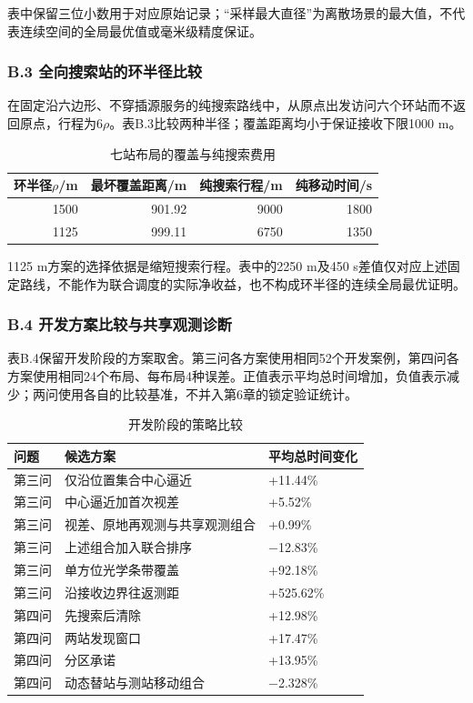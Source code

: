 \documentclass[UTF8,fontset=none,zihao=-4,a4paper]{ctexart}
\begin{document}
表中保留三位小数用于对应原始记录；``采样最大直径''为离散场景的最大值，不代表连续空间的全局最优值或毫米级精度保证。

\subsubsection{B.3 全向搜索站的环半径比较}\label{sec-B-3}

在固定沿六边形、不穿插源服务的纯搜索路线中，从原点出发访问六个环站而不返回原点，行程为\(6\rho\)。表B.3比较两种半径；覆盖距离均小于保证接收下限1000 m。

\begin{table}[H]
\centering\small
\caption{七站布局的覆盖与纯搜索费用}\label{tab-B-3}
\begin{tabular}{@{}rrrr@{}}
\toprule
环半径\(\rho\)/m & 最坏覆盖距离/m & 纯搜索行程/m & 纯移动时间/s\tabularnewline
\midrule

1500 & 901.92 & 9000 & 1800\tabularnewline
1125 & 999.11 & 6750 & 1350\tabularnewline
\bottomrule
\end{tabular}
\end{table}

1125 m方案的选择依据是缩短搜索行程。表中的2250 m及450 s差值仅对应上述固定路线，不能作为联合调度的实际净收益，也不构成环半径的连续全局最优证明。

\subsubsection{B.4 开发方案比较与共享观测诊断}\label{sec-B-4}

表B.4保留开发阶段的方案取舍。第三问各方案使用相同52个开发案例，第四问各方案使用相同24个布局、每布局4种误差。正值表示平均总时间增加，负值表示减少；两问使用各自的比较基准，不并入第6章的锁定验证统计。

\begin{table}[H]
\centering\small
\caption{开发阶段的策略比较}\label{tab-B-4}
\begin{tabular}{@{}>{\raggedright\arraybackslash}p{}
>{\raggedright\arraybackslash}p{}
>{\raggedright\arraybackslash}p{}@{}}
\toprule
问题 & 候选方案 & 平均总时间变化\tabularnewline
\midrule

第三问 & 仅沿位置集合中心逼近 & +11.44\%\tabularnewline
第三问 & 中心逼近加首次视差 & +5.52\%\tabularnewline
第三问 & 视差、原地再观测与共享观测组合 & +0.99\%\tabularnewline
第三问 & 上述组合加入联合排序 & −12.83\%\tabularnewline
第三问 & 单方位光学条带覆盖 & +92.18\%\tabularnewline
第三问 & 沿接收边界往返测距 & +525.62\%\tabularnewline
第四问 & 先搜索后清除 & +12.98\%\tabularnewline
第四问 & 两站发现窗口 & +17.47\%\tabularnewline
第四问 & 分区承诺 & +13.95\%\tabularnewline
第四问 & 动态替站与测站移动组合 & −2.328\%\tabularnewline
\bottomrule
\end{tabular}
\end{table}
\end{document}
